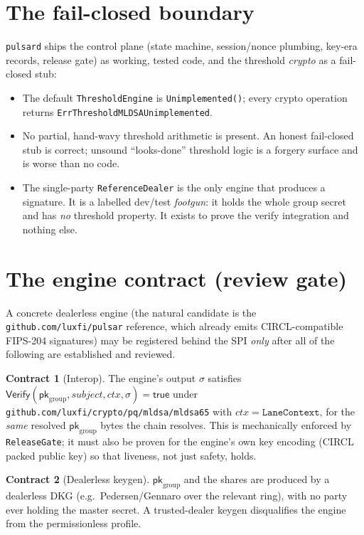 \documentclass[11pt]{article}
\newcommand{\Verify}{\mathsf{Verify}}
\newcommand{\ctx}{\mathit{ctx}}
\newcommand{\subj}{\mathit{subject}}
\theoremstyle{definition}
\newtheorem{contract}{Contract}
\theoremstyle{plain}
\begin{document}
\section{The fail-closed boundary}

\texttt{pulsard} ships the control plane (state machine, session/nonce plumbing,
key-era records, release gate) as working, tested code, and the threshold
\emph{crypto} as a fail-closed stub:
\begin{itemize}[leftmargin=1.6em]
  \item The default \texttt{ThresholdEngine} is \texttt{Unimplemented()}; every
  crypto operation returns \texttt{ErrThresholdMLDSAUnimplemented}.
  \item No partial, hand-wavy threshold arithmetic is present. An honest
  fail-closed stub is correct; unsound ``looks-done'' threshold logic is a
  forgery surface and is worse than no code.
  \item The single-party \texttt{ReferenceDealer} is the only engine that
  produces a signature. It is a labelled dev/test \emph{footgun}: it holds the
  whole group secret and has \emph{no} threshold property. It exists to prove the
  verify integration and nothing else.
\end{itemize}

\section{The engine contract (review gate)}

A concrete dealerless engine (the natural candidate is the
\texttt{github.com/luxfi/pulsar} reference, which already emits CIRCL-compatible
FIPS-204 signatures) may be registered behind the SPI \emph{only} after all of
the following are established and reviewed.

\begin{contract}[Interop]
The engine's output $\sigma$ satisfies
\(\Verify(\mathsf{pk}_{\text{group}}, \subj, \ctx, \sigma)=\mathsf{true}\) under
\texttt{github.com/luxfi/crypto/pq/mldsa/mldsa65} with
\(\ctx=\texttt{LaneContext}\), for the \emph{same} resolved
\(\mathsf{pk}_{\text{group}}\) bytes the chain resolves. This is mechanically
enforced by \texttt{ReleaseGate}; it must also be proven for the engine's own
key encoding (CIRCL packed public key) so that liveness, not just safety, holds.
\end{contract}

\begin{contract}[Dealerless keygen]
\(\mathsf{pk}_{\text{group}}\) and the shares are produced by a dealerless DKG
(e.g.\ Pedersen/Gennaro over the relevant ring), with no party ever holding the
master secret. A trusted-dealer keygen disqualifies the engine from the
permissionless profile.
\end{contract}
\end{document}
